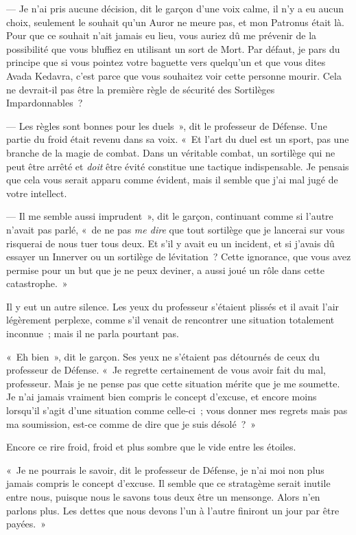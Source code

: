 --- Je n'ai pris aucune décision, dit le garçon d'une voix calme, il n'y a eu aucun choix, seulement le souhait qu'un Auror ne meure pas, et mon Patronus était là.
Pour que ce souhait n'ait jamais eu lieu, vous auriez dû me prévenir de la possibilité que vous bluffiez en utilisant un sort de Mort.
Par défaut, je pars du principe que si vous pointez votre baguette vers quelqu'un et que vous dites Avada Kedavra, c'est parce que vous souhaitez voir cette personne mourir.
Cela ne devrait-il pas être la première règle de sécurité des Sortilèges Impardonnables~?

--- Les règles sont bonnes pour les duels~», dit le professeur de Défense.
Une partie du froid était revenu dans sa voix.
«~Et l'art du duel est un sport, pas une branche de la magie de combat.
Dans un véritable combat, un sortilège qui ne peut être arrêté et \emph{doit} être évité constitue une tactique indispensable.
Je pensais que cela vous serait apparu comme évident, mais il semble que j'ai mal jugé de votre intellect.

--- Il me semble aussi imprudent~», dit le garçon, continuant comme si l'autre n'avait pas parlé, «~de ne pas \emph{me dire} que tout sortilège que je lancerai sur vous risquerai de nous tuer tous deux.
Et s'il y avait eu un incident, et si j'avais dû essayer un Innerver ou un sortilège de lévitation~?
Cette ignorance, que vous avez permise pour un but que je ne peux deviner, a aussi joué un rôle dans cette catastrophe.~»

Il y eut un autre silence.
Les yeux du professeur s'étaient plissés et il avait l'air légèrement perplexe, comme s'il venait de rencontrer une situation totalement inconnue~; mais il ne parla pourtant pas.

«~Eh bien~», dit le garçon.
Ses yeux ne s'étaient pas détournés de ceux du professeur de Défense.
«~Je regrette certainement de vous avoir fait du mal, professeur.
Mais je ne pense pas que cette situation mérite que je me soumette.
Je n'ai jamais vraiment bien compris le concept d'excuse, et encore moins lorsqu'il s'agit d'une situation comme celle-ci~; vous donner mes regrets mais pas ma soumission, est-ce comme de dire que je suis désolé~?~»

Encore ce rire froid, froid et plus sombre que le vide entre les étoiles.

«~Je ne pourrais le savoir, dit le professeur de Défense, je n'ai moi non plus jamais compris le concept d'excuse.
Il semble que ce stratagème serait inutile entre nous, puisque nous le savons tous deux être un mensonge.
Alors n'en parlons plus.
Les dettes que nous devons l'un à l'autre finiront un jour par être payées.~»

